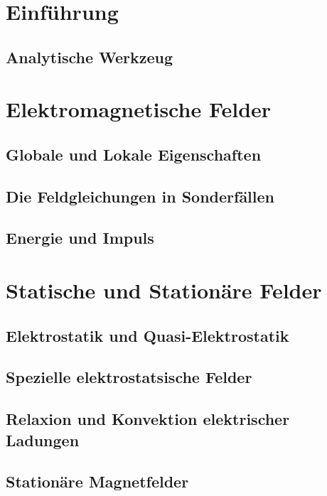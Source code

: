 	\section{Einführung}
	\subsection{Analytische Werkzeug}
	
	\section{Elektromagnetische Felder}
	\subsection{Globale und Lokale Eigenschaften}
	
	\subsection{Die Feldgleichungen in Sonderfällen}
	
	\subsection{Energie und Impuls}
	
	\section{Statische und Stationäre Felder}
	\subsection{Elektrostatik und Quasi-Elektrostatik}
	
	\subsection{Spezielle elektrostatsische Felder}
	
	\subsection{Relaxion und Konvektion elektrischer Ladungen}
	
	\subsection{Stationäre Magnetfelder}
	
